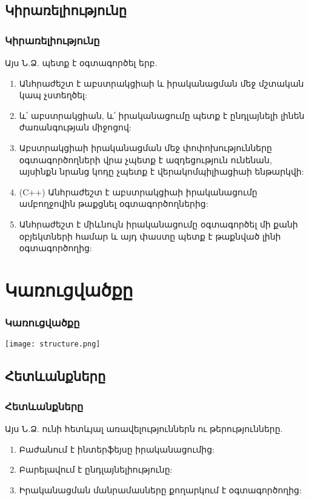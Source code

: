 \documentclass{beamer}
\begin{document}
\subsection{Կիրառելիությունը}
\begin{frame}\frametitle{Կիրառելիությունը}
Այս Ն.Ձ. պետք է օգտագործել երբ.
\vfill
{
    \scriptsize
    \begin{enumerate}
        \item Անհրաժեշտ է աբստրակցիաի և իրականացման մեջ մշտական
        կապ չստեղծել: \pause \vfill
        \item և՛ աբստրակցիան, և՛ իրականացումը պետք է ընդլայնելի լինեն
        ժառանգության միջոցով: \pause \vfill
        \item Աբստրակցիաի իրականացման մեջ փոփոխությունները օգտագործողների
        վրա չպետք է ազդեցություն ունենան, այսինքն նրանց կոդը չպետք է
        վերակոմպիլիացիաի ենթարկվի: \pause \vfill
        \item (C++) Անհրաժեշտ է աբստրակցիաի իրականացումը ամբողջովին թաքցնել
        օգտագործողներից: \pause \vfill
        \item Անհրաժեշտ է միևնույն իրականացումը օգտագործել մի քանի օբյեկտների
        համար և այդ փաստը պետք է թաքնված լինի օգտագործողից:
    \end{enumerate}
}
\end{frame}

\section{Կառուցվածքը}
\begin{frame}\frametitle{Կառուցվածքը}
\begin{center}
    \texttt{[image: structure.png]}
\end{center}
\end{frame}

\subsection{Հետևանքները}
\begin{frame}\frametitle{Հետևանքները}
Այս Ն.Ձ. ունի հետևյալ առավելություններն ու թերությունները.
\vfill
\begin{enumerate}
    \item Բաժանում է ինտերֆեյսը իրականացումից: \pause \vfill
    \item Բարելավում է ընդլայնելիությունը: \pause \vfill
    \item Իրականացման մանրամասները քողարկում է օգտագործողից:
\end{enumerate}
\end{frame}
\end{document}
